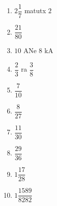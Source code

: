 \begin{multicols}{4}
\begin{enumerate}[$(1)$]
\item $2\dfrac{1}{7}$  matutx $2$ 
\item $\dfrac{21}{80}$ 
\item $10$ ANe $8$ kA 
\item $\dfrac{2}{3}$ ra $\dfrac{3}{8}$
\item $\dfrac{7}{10}$ 
\item $\dfrac{8}{27}$ 
\item $\dfrac{11}{30}$ 
\item $\dfrac{29}{36}$
\item $1\dfrac{17}{28}$ 
\item $1\dfrac{1589}{8282}$ 
\end{enumerate}
\end{multicols}



